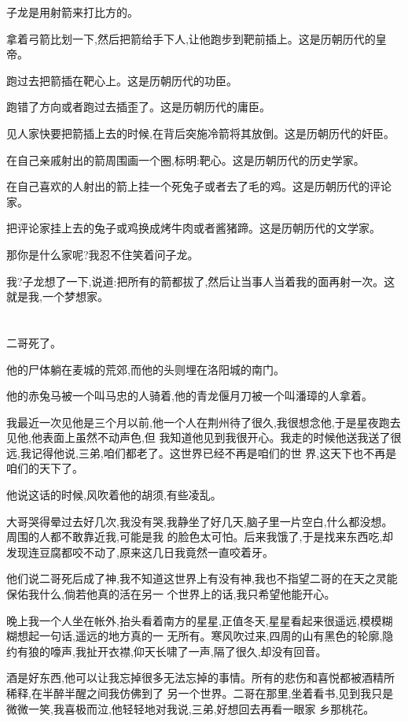 ﻿\documentclass[12pt,twocolumn]{article}
\begin{document}
子龙是用射箭来打比方的。

拿着弓箭比划一下,然后把箭给手下人,让他跑步到靶前插上。\myrule 这是历朝历代的皇帝。

跑过去把箭插在靶心上。\myrule 这是历朝历代的功臣。

跑错了方向或者跑过去插歪了。\myrule 这是历朝历代的庸臣。

见人家快要把箭插上去的时候,在背后突施冷箭将其放倒。\myrule 这是历朝历代的奸臣。

在自己亲戚射出的箭周围画一个圈,标明:靶心。\myrule 这是历朝历代的历史学家。

在自己喜欢的人射出的箭上挂一个死兔子或者去了毛的鸡。\myrule 这是历朝历代的评论家。

把评论家挂上去的兔子或鸡换成烤牛肉或者酱猪蹄。\myrule 这是历朝历代的文学家。

那你是什么家呢?我忍不住笑着问子龙。

我?子龙想了一下,说道:把所有的箭都拔了,然后让当事人当着我的面再射一次。\myrule 这就是我,一个梦想家。

\section{}

二哥死了。

他的尸体躺在麦城的荒郊,而他的头则埋在洛阳城的南门。

他的赤兔马被一个叫马忠的人骑着,他的青龙偃月刀被一个叫潘璋的人拿着。

我最近一次见他是三个月以前,他一个人在荆州待了很久,我很想念他,于是星夜跑去见他,他表面上虽然不动声色,但
我知道他见到我很开心。我走的时候他送我送了很远,我记得他说,三弟,咱们都老了。这世界已经不再是咱们的世
界,这天下也不再是咱们的天下了。

他说这话的时候,风吹着他的胡须,有些凌乱。

大哥哭得晕过去好几次,我没有哭,我静坐了好几天,脑子里一片空白,什么都没想。周围的人都不敢靠近我,可能是我
的脸色太可怕。后来我饿了,于是找来东西吃,却发现连豆腐都咬不动了,原来这几日我竟然一直咬着牙。

他们说二哥死后成了神,我不知道这世界上有没有神,我也不指望二哥的在天之灵能保佑我什么,倘若他真的活在另一
个世界上的话,我只希望他能开心。

晚上我一个人坐在帐外,抬头看着南方的星星,正值冬天,星星看起来很遥远,模模糊糊想起一句话,遥远的地方真的一
无所有。寒风吹过来,四周的山有黑色的轮廓,隐约有狼的嚎声,我扯开衣襟,仰天长啸了一声,隔了很久,却没有回音。

酒是好东西,他可以让我忘掉很多无法忘掉的事情。所有的悲伤和喜悦都被酒精所稀释,在半醉半醒之间我仿佛到了
另一个世界。二哥在那里,坐着看书,见到我只是微微一笑,我喜极而泣,他轻轻地对我说,三弟,好想回去再看一眼家
乡那桃花。
\end{document}
